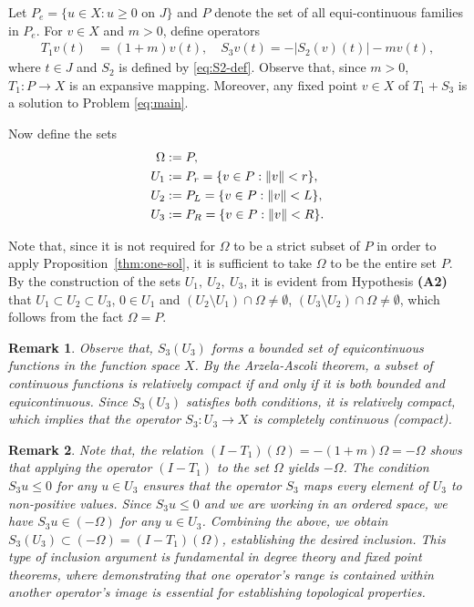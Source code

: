 \documentclass[reqno, 12pt]{amsart}
\newtheorem{rem}{Remark}[section]
\numberwithin{equation}{section}
\begin{document}
Let $P_e = \{u \in X : u \geq 0 \text{ on } J \}$ and $P$ denote the set of all equi-continuous families in $P_e$. For $v \in X$ and $m>0$, define operators
\begin{align}
\label{op:T1S3}
T_1v(t) &= (1 + m)v(t), \quad
S_3v(t) = - |S_2(v)(t)| - m v(t), 
\end{align}
where $t \in J$ and $S_2$ is defined by \eqref{eq:S2-def}. Observe that, since $m>0$, $T_1: P \to X$ is an expansive mapping. Moreover, any fixed point $v \in X$ of $T_1 + S_3$ is a solution to Problem \eqref{eq:main}.

Now define the sets
\begin{align}
\label{sets}
\Omega &:= P, \notag \\ 
U_1 &:= P_r = \{v \in P : \|v\| < r\}, \notag\\
U_2 &:= P_L = \{v \in P : \|v\| < L\}, \notag \\
U_3 &:= P_{R} = \{v \in P : \|v\| < R\}. 
\end{align}

Note that, since it is not required for \( \Omega \) to be a strict subset of \( P \) in order to apply Proposition~\ref{thm:one-sol}, it is sufficient to take \( \Omega \) to be the entire set \( P \). By the construction of the sets $U_1,~U_2,~U_3$, it is evident from Hypothesis {\bf (A2)} that $U_1 \subset U_2 \subset U_3$, $0 \in U_1$ and $(U_2 \setminus U_1) \cap \Omega \neq \emptyset$, $(U_3 \setminus U_2) \cap \Omega \neq \emptyset$, which follows from the fact $\Omega = P$. 
\begin{rem}{\rm
Observe that, $S_3(U_3)$ forms a bounded set of equicontinuous functions in the function space $X$. By the Arzela-Ascoli theorem, a subset of continuous functions is relatively compact if and only if it is both bounded and equicontinuous. Since $S_3(U_3)$ satisfies both conditions, it is relatively compact, which implies that the operator $S_3: U_3 \to X$ is completely continuous (compact).}
\end{rem}

\begin{rem}{\rm Note that, the relation $(I-T_1)(\Omega) = -(1+m)\Omega = -\Omega$ shows that applying the operator $(I-T_1)$ to the set $\Omega$ yields $-\Omega$. The condition $S_3 u \leq 0$ for any $u \in U_3$ ensures that the operator $S_3$ maps every element of $U_3$ to non-positive values. Since $S_3 u \leq 0$ and we are working in an ordered space, we have $S_3 u \in (-\Omega)$ for any $u \in U_3$. Combining the above, we obtain $S_3(U_3) \subset (-\Omega) = (I-T_1)(\Omega)$, establishing the desired inclusion. This type of inclusion argument is fundamental in degree theory and fixed point theorems, where demonstrating that one operator's range is contained within another operator's image is essential for establishing topological properties.}
\end{rem}
\end{document}
